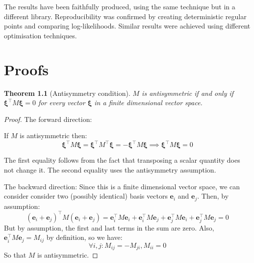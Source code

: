 \documentclass[12pt,a4paper,twoside]{report}
\newtheorem{thm}{Theorem}[section]
\theoremstyle{definition}
\begin{document}
The results have been faithfully produced, using the same technique but in a different library. Reproducibility was confirmed by creating deterministic regular points and comparing log-likelihoods. Similar results were achieved using different optimisation techniques.

\label{lastcontentpage} %

\printbibliography

\appendix

\chapter{Proofs}
\begin{thm}[Antisymmetry condition]\label{antisymmetry}
	$M$ is antisymmetric if and only if $\boldsymbol \xi^\top M\boldsymbol \xi=0$ for every vector $\boldsymbol \xi$ in a finite dimensional vector space.
\end{thm}
\begin{proof}
	The forward direction:
	
	If $M$ is antisymmetric then:
	$$\boldsymbol \xi^\top M \boldsymbol \xi = \boldsymbol \xi^\top M^\top \boldsymbol \xi = -\boldsymbol \xi^\top M\boldsymbol \xi\implies \boldsymbol \xi^\top M \boldsymbol \xi=0$$

	The first equality follows from the fact that transposing a scalar quantity does not change it. The second equality uses the antisymmetry assumption.

	The backward direction:
	Since this is a finite dimensional vector space, we can consider consider two (possibly identical) basis vectors $\mathbf e_i$ and $\mathbf e_j$. Then, by assumption:
	$$(\mathbf e_i+\mathbf e_j)^\top M (\mathbf e_i + \mathbf e_j) = \mathbf e_i^\top M \mathbf e_i + \mathbf e_i^\top M \mathbf e_j + \mathbf e_j^\top M \mathbf e_i +\mathbf e_j^\top M \mathbf e_j=0$$
	But by assumption, the first and last terms in the sum are zero. Also, $\mathbf e_i^\top M \mathbf e_j=M_{ij}$ by definition, so we have:
	$$\forall i,j:M_{ij}=-M_{ji}, M_{ii}=0$$
	So that $M$ is antisymmetric.
\end{proof}

\label{lastpage}
\end{document}
